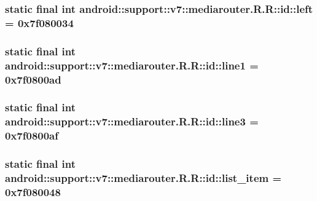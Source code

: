 \hypertarget{classandroid_1_1support_1_1v7_1_1mediarouter_1_1_r_1_1id_b2e5f4f2034b77b410d6f96241d61da4}{
\subsubsection[{left}]{\setlength{\rightskip}{0pt plus 5cm}static final int android::support::v7::mediarouter.R.R::id::left = 0x7f080034}}
\label{classandroid_1_1support_1_1v7_1_1mediarouter_1_1_r_1_1id_b2e5f4f2034b77b410d6f96241d61da4}


\hypertarget{classandroid_1_1support_1_1v7_1_1mediarouter_1_1_r_1_1id_5ed86eb02968e214db0b43727a4aeebc}{
\subsubsection[{line1}]{\setlength{\rightskip}{0pt plus 5cm}static final int android::support::v7::mediarouter.R.R::id::line1 = 0x7f0800ad}}
\label{classandroid_1_1support_1_1v7_1_1mediarouter_1_1_r_1_1id_5ed86eb02968e214db0b43727a4aeebc}


\hypertarget{classandroid_1_1support_1_1v7_1_1mediarouter_1_1_r_1_1id_6b20a70e4284dda7511d43eeb8b51144}{
\subsubsection[{line3}]{\setlength{\rightskip}{0pt plus 5cm}static final int android::support::v7::mediarouter.R.R::id::line3 = 0x7f0800af}}
\label{classandroid_1_1support_1_1v7_1_1mediarouter_1_1_r_1_1id_6b20a70e4284dda7511d43eeb8b51144}


\hypertarget{classandroid_1_1support_1_1v7_1_1mediarouter_1_1_r_1_1id_04d7f80f6f75cb398adcce0dcc1c4890}{
\subsubsection[{list\_\-item}]{\setlength{\rightskip}{0pt plus 5cm}static final int android::support::v7::mediarouter.R.R::id::list\_\-item = 0x7f080048}}
\label{classandroid_1_1support_1_1v7_1_1mediarouter_1_1_r_1_1id_04d7f80f6f75cb398adcce0dcc1c4890}


